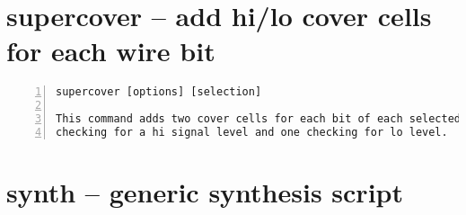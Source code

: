\section{supercover -- add hi/lo cover cells for each wire bit}
\label{cmd:supercover}
\begin{lstlisting}[numbers=left,frame=single]
    supercover [options] [selection]

This command adds two cover cells for each bit of each selected wire, one
checking for a hi signal level and one checking for lo level.
\end{lstlisting}

\section{synth -- generic synthesis script}
\label{cmd:synth}
